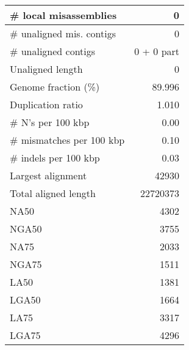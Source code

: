 \documentclass[12pt,a4paper]{article}
\begin{document}
\begin{table}[ht]
\begin{center}
\begin{tabular}{|l*{1}{|r}|}
\# local misassemblies & 0 \\ \hline
\# unaligned mis. contigs & 0 \\ \hline
\# unaligned contigs & 0 + 0 part \\ \hline
Unaligned length & 0 \\ \hline
Genome fraction (\%) & 89.996 \\ \hline
Duplication ratio & 1.010 \\ \hline
\# N's per 100 kbp & 0.00 \\ \hline
\# mismatches per 100 kbp & 0.10 \\ \hline
\# indels per 100 kbp & 0.03 \\ \hline
Largest alignment & 42930 \\ \hline
Total aligned length & 22720373 \\ \hline
NA50 & 4302 \\ \hline
NGA50 & 3755 \\ \hline
NA75 & 2033 \\ \hline
NGA75 & 1511 \\ \hline
LA50 & 1381 \\ \hline
LGA50 & 1664 \\ \hline
LA75 & 3317 \\ \hline
LGA75 & 4296 \\ \hline
\end{tabular}
\end{center}
\end{table}
\end{document}
